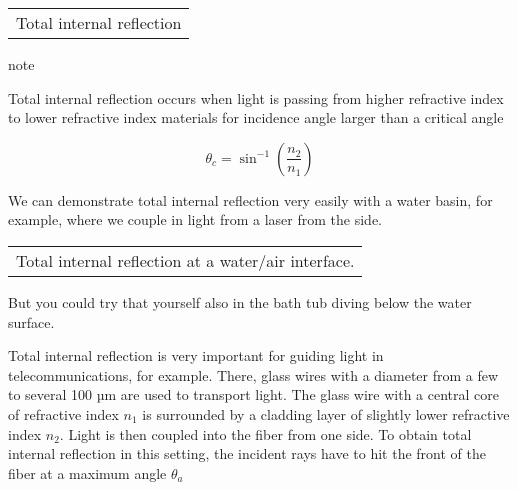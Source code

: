 \documentclass[letterpaper,10pt,english]{sphinxmanual}
\begin{document}
\begin{savenotes}\sphinxattablestart
\centering
\begin{tabulary}{\linewidth}[t]{|T|}
\hline
\sphinxstyletheadfamily 
{} 
\\
\hline
{} Total internal reflection
\\
\hline
\end{tabulary}
\par
\sphinxattableend\end{savenotes}

\begin{sphinxadmonition}{note}{}\unskip
{}

Total internal reflection occurs when light is passing from higher refractive index to lower refractive index materials for incidence angle larger than a critical angle

\begin{equation}
\theta_c=\sin^{-1}\left (\frac{n_2}{n_1}\right )
\end{equation}
\end{sphinxadmonition}

We can demonstrate total internal reflection very easily with a water basin, for example, where we couple in light from a laser from the side.


\begin{savenotes}\sphinxattablestart
\centering
\begin{tabulary}{\linewidth}[t]{|T|}
\hline
\sphinxstyletheadfamily 
{} 
\\
\hline
{} Total internal reflection at a water/air interface.
\\
\hline
\end{tabulary}
\par
\sphinxattableend\end{savenotes}

But you could try that yourself also in the bath tub diving below the water surface.

 Total internal reflection is very important for guiding light in telecommunications, for example. There, glass wires with a diameter from a few to several 100 µm are used to transport light. The glass wire with a central core of refractive index \(n_1\) is surrounded by a cladding layer of slightly lower refractive index \(n_2\). Light is then coupled into the fiber from one side. To obtain total internal reflection in this setting, the incident rays have to hit the
front of the fiber at a maximum angle \(\theta_{a}\)
\end{document}
